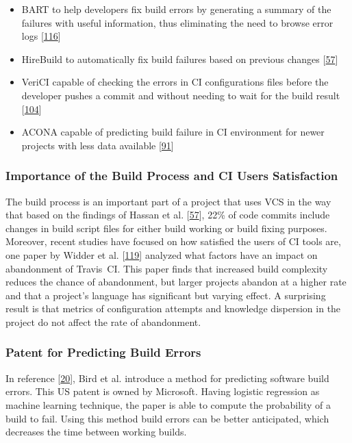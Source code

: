 \documentclass[]{book}
\providecommand{\tightlist}{%
  \setlength{\itemsep}{0pt}\setlength{\parskip}{0pt}}
\begin{document}
\begin{itemize}
\tightlist
\item
  BART to help developers fix build errors by generating a summary of
  the failures with useful information, thus eliminating the need to
  browse error logs {[}\protect\hyperlink{ref-vassallo2018break}{116}{]}
\item
  HireBuild to automatically fix build failures based on previous
  changes {[}\protect\hyperlink{ref-hassan2018hirebuild}{57}{]}
\item
  VeriCI capable of checking the errors in CI configurations files
  before the developer pushes a commit and without needing to wait for
  the build result
  {[}\protect\hyperlink{ref-santolucito2018statically}{104}{]}
\item
  ACONA capable of predicting build failure in CI environment for newer
  projects with less data available
  {[}\protect\hyperlink{ref-ni2018acona}{91}{]}
\end{itemize}

\subsubsection{Importance of the Build Process and CI Users
Satisfaction}\label{importance-of-the-build-process-and-ci-users-satisfaction}

The build process is an important part of a project that uses VCS in the
way that based on the findings of Hassan et al.
{[}\protect\hyperlink{ref-hassan2018hirebuild}{57}{]}, 22\% of code
commits include changes in build script files for either build working
or build fixing purposes. Moreover, recent studies have focused on how
satisfied the users of CI tools are, one paper by Widder et al.
{[}\protect\hyperlink{ref-widder2018m}{119}{]} analyzed what factors
have an impact on abandonment of Travis~CI. This paper finds that
increased build complexity reduces the chance of abandonment, but larger
projects abandon at a higher rate and that a project's language has
significant but varying effect. A surprising result is that metrics of
configuration attempts and knowledge dispersion in the project do not
affect the rate of abandonment.

\subsubsection{Patent for Predicting Build
Errors}\label{patent-for-predicting-build-errors}

In reference {[}\protect\hyperlink{ref-bird2017predicting}{20}{]}, Bird
et al. introduce a method for predicting software build errors. This US
patent is owned by Microsoft. Having logistic regression as machine
learning technique, the paper is able to compute the probability of a
build to fail. Using this method build errors can be better anticipated,
which decreases the time between working builds.
\end{document}
